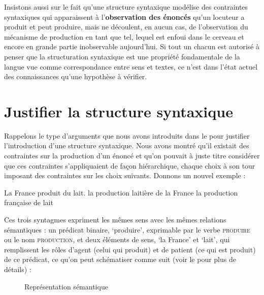 Insistons aussi sur le fait qu’une structure syntaxique modélise des contraintes syntaxiques qui apparaissent à l’\textbf{observation des énoncés} qu’un locuteur a produit et peut produire, mais ne découlent, en aucun cas, de l’observation du mécanisme de production en tant que tel, lequel est enfoui dans le cerveau et encore en grande partie inobservable aujourd’hui. Si tout un chacun est autorisé à penser que la structuration syntaxique est une propriété fondamentale de la langue vue comme correspondance entre sens et textes, ce n’est dans l’état actuel des connaissances qu’une hypothèse à vérifier.

\section{Justifier la structure syntaxique}\label{sec:3.2.1}

Rappelons le type d’arguments que nous avons introduits dans le  pour justifier l’introduction d’une structure syntaxique. Nous avons montré qu’il existait des contraintes sur la production d’un énoncé et qu’on pouvait à juste titre considérer que ces contraintes s’appliquaient de façon hiérarchique, chaque choix à son tour imposant des contraintes sur les choix suivants. Donnons un nouvel exemple :

\ea La France produit du lait.
\ex la production laitière de la France
\ex la production française de lait
\z

Ces trois syntagmes expriment les mêmes sens avec les mêmes relations sémantiques : un prédicat binaire, ‘produire’, exprimable par le verbe \textsc{produire} ou le nom \textsc{production,} et deux éléments de sens, ‘la France’ et ‘lait’, qui remplissent les rôles d’agent (celui qui produit) et de patient (ce qui est produit) de ce prédicat, ce qu’on peut schématiser comme suit (voir le  pour plus de détails) :

\begin{figure}
\caption{\label{fig:}Représentation sémantique}
\end{figure}


